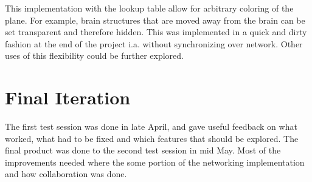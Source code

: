 This implementation with the lookup table allow for arbitrary coloring of the plane. For example, brain structures that are moved away from the brain can be set transparent and therefore hidden. This was implemented in a quick and dirty fashion at the end of the project i.a. without synchronizing over network. Other uses of this flexibility could be further explored. 




























\subsubsection*{}



\section[Final Iteration]{Final Iteration}\label{chap:finaliter}

The first test session was done in late April, and gave useful feedback on what worked, what had to be fixed and which features that should be explored. The final product was done to the second test session in mid May. Most of the improvements needed where the some portion of the networking implementation and how collaboration was done. 




